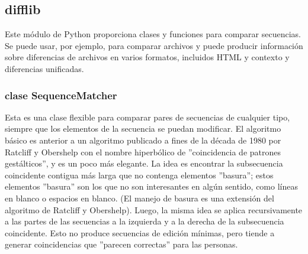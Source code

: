 %
%

\subsection{difflib}
Este módulo de Python proporciona clases y funciones para comparar secuencias. Se puede usar, por ejemplo, para comparar archivos y puede producir información sobre diferencias de archivos en varios formatos, incluidos HTML y contexto y diferencias unificadas.

 \subsubsection{clase SequenceMatcher}
 Esta es una clase flexible para comparar pares de secuencias de cualquier tipo, siempre que los elementos de la secuencia se puedan modificar. El algoritmo básico es anterior a un algoritmo publicado a fines de la década de 1980 por Ratcliff y Obershelp con el nombre hiperbólico de ''coincidencia de patrones gestálticos'', y es un poco más elegante. La idea es encontrar la subsecuencia coincidente contigua más larga que no contenga elementos ''basura''; estos elementos ''basura'' son los que no son interesantes en algún sentido, como líneas en blanco o espacios en blanco. (El manejo de basura es una extensión del algoritmo de Ratcliff y Obershelp). Luego, la misma idea se aplica recursivamente a las partes de las secuencias a la izquierda y a la derecha de la subsecuencia coincidente. Esto no produce secuencias de edición mínimas, pero tiende a generar coincidencias que ''parecen correctas'' para las personas.
